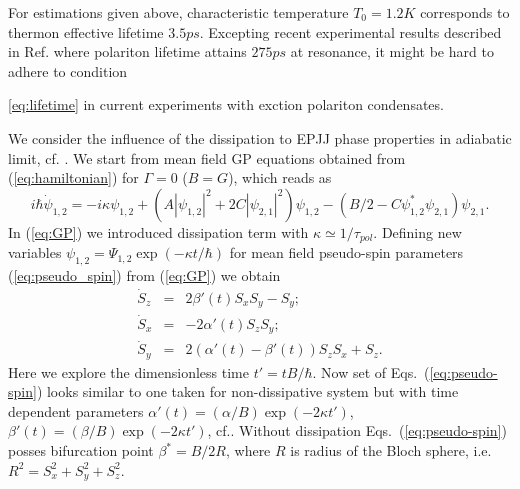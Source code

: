 \documentclass[aps, pre, preprint, groupedaddress, superscriptaddress, showkeys, showpacs] {revtex4-1}
\begin{document}
For estimations given above, characteristic  temperature $T_{0}=1.2K$ corresponds to thermon effective lifetime  $3.5ps$. Excepting  recent experimental results  described in Ref. \cite{Snoke_2017} where polariton lifetime attains  $275ps$ at resonance, it might  be hard to adhere to  condition {\eqref{eq:lifetime} in current experiments with exction polariton condensates. 

We consider the influence of the dissipation to  EPJJ phase properties in adiabatic limit, cf. \cite{Sols}.
We start from mean field GP equations obtained from  (\ref{eq:hamiltonian}) for  $\Gamma = 0$ ($B = G$),  which reads as 
%
\begin{equation}
i \hbar \dot{\psi}_{1,2} = -i \kappa \psi_{1,2} + (A|\psi_{1,2}|^2 + 2C |\psi_{2,1}|^2) \psi_{1,2} - (B/2 - C \psi_{1,2}^* \psi_{2,1}) \psi_{2,1}. 
\label{eq:GP}
\end{equation}
%
In (\ref{eq:GP}) we introduced dissipation  term with $\kappa \simeq 1/\tau_{pol}$.
Defining new variables  $\psi_{1,2} = \Psi_{1,2} \exp(-\kappa t / \hbar)$ for mean field pseudo-spin  parameters (\ref{eq:pseudo_spin}) from ({\ref{eq:GP}}) we obtain
%
%
%
%
% 
\begin{equation}
\begin{array}{lcl}
\dot{S}_z & = &  2 \beta'(t) S_x S_y - S_y; \\
\dot{S}_x & = & -2 \alpha'(t) S_z S_y; \\
\dot{S}_y & = & 2(\alpha'(t) - \beta'(t)) S_z S_x + S_z.
\end{array}
\label{eq:pseudo-spin}
\end{equation}
%
Here we explore the dimensionless time $t' = t B / \hbar$.
Now set of Eqs.\ ({\ref{eq:pseudo-spin}}) looks similar to one taken for  non-dissipative system but with time dependent parameters $\alpha'(t) = (\alpha / B) \exp(-2 \kappa t')$, $\beta'(t) = (\beta / B) \exp(-2 \kappa t')$, cf.\cite{Sedov}. Without dissipation Eqs.\ ({\ref{eq:pseudo-spin}}) posses  bifurcation point $\beta^* = B / 2R$, where $R$ is  radius of the Bloch  sphere, i.e. $R^2=S_x^2 + S_y^2 + S_z^2$.
%
%

}
\end{document}
